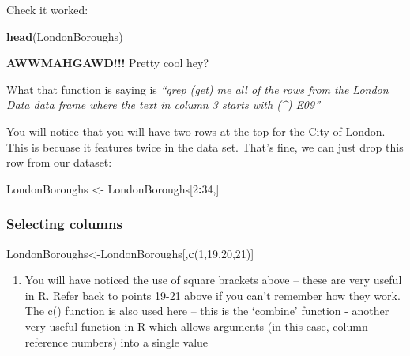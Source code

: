 \documentclass[]{book}
\newenvironment{Shaded}{\begin{snugshade}}{\end{snugshade}}
\newcommand{\DecValTok}[1]{\textcolor[rgb]{0.00,0.00,0.81}{#1}}
\newcommand{\KeywordTok}[1]{\textcolor[rgb]{0.13,0.29,0.53}{\textbf{#1}}}
\newcommand{\NormalTok}[1]{#1}
\newcommand{\OperatorTok}[1]{\textcolor[rgb]{0.81,0.36,0.00}{\textbf{#1}}}
\newcommand{\StringTok}[1]{\textcolor[rgb]{0.31,0.60,0.02}{#1}}
\providecommand{\tightlist}{%
  \setlength{\itemsep}{0pt}\setlength{\parskip}{0pt}}
\begin{document}
Check it worked:

\begin{Shaded}
\begin{Highlighting}[]
\KeywordTok{head}\NormalTok{(LondonBoroughs)}
\end{Highlighting}
\end{Shaded}

\textbf{AWWMAHGAWD!!!} Pretty cool hey?

What that function is saying is \emph{``grep (get) me all of the rows from the London Data data frame where the text in column 3 starts with (\^{}) E09''}

You will notice that you will have two rows at the top for the City of London. This is becuase it features twice in the data set. That's fine, we can just drop this row from our dataset:

\begin{Shaded}
\begin{Highlighting}[]
\NormalTok{LondonBoroughs <-}\StringTok{ }\NormalTok{LondonBoroughs[}\DecValTok{2}\OperatorTok{:}\DecValTok{34}\NormalTok{,]}
\end{Highlighting}
\end{Shaded}

\hypertarget{selecting-columns}{%
\subsubsection{Selecting columns}\label{selecting-columns}}

\begin{Shaded}
\begin{Highlighting}[]
\NormalTok{LondonBoroughs<-LondonBoroughs[,}\KeywordTok{c}\NormalTok{(}\DecValTok{1}\NormalTok{,}\DecValTok{19}\NormalTok{,}\DecValTok{20}\NormalTok{,}\DecValTok{21}\NormalTok{)]}
\end{Highlighting}
\end{Shaded}

\begin{enumerate}
\def\labelenumi{\arabic{enumi}.}
\setcounter{enumi}{29}
\tightlist
\item
  You will have noticed the use of square brackets above -- these are very useful in R. Refer back to points 19-21 above if you can't remember how they work. The c() function is also used here -- this is the `combine' function - another very useful function in R which allows arguments (in this case, column reference numbers) into a single value
\end{enumerate}
\end{document}
